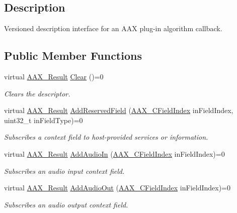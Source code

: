 \subsection{Description}
Versioned description interface for an A\+A\+X plug-\/in algorithm callback. \subsection*{Public Member Functions}
\begin{DoxyCompactItemize}
\item 
virtual \hyperlink{a00149_a4d8f69a697df7f70c3a8e9b8ee130d2f}{A\+A\+X\+\_\+\+Result} \hyperlink{a00050_ab93e4b968f3239326ac1046b64eab2f5}{Clear} ()=0
\begin{DoxyCompactList}\small\item\em Clears the descriptor. \end{DoxyCompactList}\item 
virtual \hyperlink{a00149_a4d8f69a697df7f70c3a8e9b8ee130d2f}{A\+A\+X\+\_\+\+Result} \hyperlink{a00050_aa81ce274471a76742e71d02bc3442253}{Add\+Reserved\+Field} (\hyperlink{a00149_ae807f8986143820cfb5d6da32165c9c7}{A\+A\+X\+\_\+\+C\+Field\+Index} in\+Field\+Index, uint32\+\_\+t in\+Field\+Type)=0
\begin{DoxyCompactList}\small\item\em Subscribes a context field to host-\/provided services or information. \end{DoxyCompactList}\item 
virtual \hyperlink{a00149_a4d8f69a697df7f70c3a8e9b8ee130d2f}{A\+A\+X\+\_\+\+Result} \hyperlink{a00050_a81370dad377b30b3c5dec9ba0e9ad310}{Add\+Audio\+In} (\hyperlink{a00149_ae807f8986143820cfb5d6da32165c9c7}{A\+A\+X\+\_\+\+C\+Field\+Index} in\+Field\+Index)=0
\begin{DoxyCompactList}\small\item\em Subscribes an audio input context field. \end{DoxyCompactList}\item 
virtual \hyperlink{a00149_a4d8f69a697df7f70c3a8e9b8ee130d2f}{A\+A\+X\+\_\+\+Result} \hyperlink{a00050_a70e7e5c55208bcafd6b402eebf12aeb7}{Add\+Audio\+Out} (\hyperlink{a00149_ae807f8986143820cfb5d6da32165c9c7}{A\+A\+X\+\_\+\+C\+Field\+Index} in\+Field\+Index)=0
\begin{DoxyCompactList}\small\item\em Subscribes an audio output context field. \end{DoxyCompactList}\item 

\end{DoxyCompactItemize}
